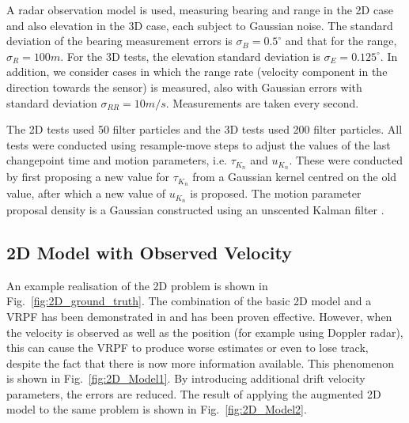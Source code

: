 \documentclass[conference]{IEEEtran}
\begin{document}
A radar observation model is used, measuring bearing and range in the 2D case and also elevation in the 3D case, each subject to Gaussian noise. The standard deviation of the bearing measurement errors is $\sigma_B = 0.5^{\circ}$ and that for the range, $\sigma_R = 100m$. For the 3D tests, the elevation standard deviation is $\sigma_E = 0.125^{\circ}$. In addition, we consider cases in which the range rate (velocity component in the direction towards the sensor) is measured, also with Gaussian errors with standard deviation $\sigma_{RR} = 10m/s$. Measurements are taken every second.

The 2D tests used 50 filter particles and the 3D tests used 200 filter particles. All tests were conducted using resample-move steps to adjust the values of the last changepoint time and motion parameters, i.e. $\tau_{K_n}$ and $u_{K_n}$. These were conducted by first proposing a new value for $\tau_{K_n}$ from a Gaussian kernel centred on the old value, after which a new value of $u_{K_n}$ is proposed. The motion parameter proposal density is a Gaussian constructed using an unscented Kalman filter \cite{Julier2004}.



\subsection{2D Model with Observed Velocity}

An example realisation of the 2D problem is shown in Fig.~\ref{fig:2D_ground_truth}. The combination of the basic 2D model and a VRPF has been demonstrated in \cite{Godsill2007} and has been proven effective. However, when the velocity is observed as well as the position (for example using Doppler radar), this can cause the VRPF to produce worse estimates or even to lose track, despite the fact that there is now more information available. This phenomenon is shown in Fig.~\ref{fig:2D_Model1}. By introducing additional drift velocity parameters, the errors are reduced. The result of applying the augmented 2D model to the same problem is shown in Fig.~\ref{fig:2D_Model2}.
\end{document}
